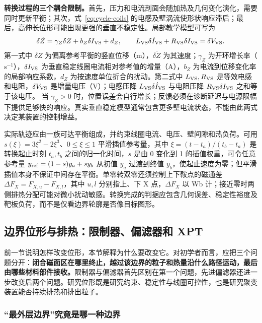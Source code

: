 \documentclass[12pt,fontset=none]{ctexart}
\numberwithin{equation}{section}
\numberwithin{table}{section}
\numberwithin{figure}{section}
\begin{document}
\textbf{转换过程的三个耦合限制。}首先，压力和电流剖面会随加热及几何变化演化，需要同时更新平衡；其次，式~\eqref{eq:cycle-coils} 的电感及壁涡流使形状响应滞后；最后，高伸长位形可能出现更强的垂直不稳定性。局部教学模型可写为
\begin{equation}\label{eq:cycle-vertical}
 \delta\dot Z=\gamma_Z\delta Z+b_Z\delta I_{\rm VS}+d_Z,
 \qquad L_{\rm VS}\delta\dot I_{\rm VS}+R_{\rm VS}\delta I_{\rm VS}=\delta V_{\rm VS}.
\end{equation}
第一式中 $\delta Z$ 为偏离参考平衡的竖直位移（m），$\delta\dot Z$ 为其速度；$\gamma_Z$ 为开环增长率（$\mathrm{s^{-1}}$），$\delta I_{\rm VS}$ 为垂直稳定线圈电流相对参考值的增量（A），$b_Z$ 为电流到位移变化率的局部响应系数，$d_Z$ 为按速度单位折合的扰动。第二式中 $L_{\rm VS},R_{\rm VS}$ 是等效电感和电阻，$\delta V_{\rm VS}$ 是增量电压（V）；电感压降 $L_{\rm VS}\delta\dot I_{\rm VS}$ 与电阻压降 $R_{\rm VS}\delta I_{\rm VS}$ 之和等于该电压。
当 $\gamma_Z>0$ 时，位置误差会自行增长；反馈必须在诊断延迟与电源限幅下提供足够快的响应。真实垂直稳定模型通常包含更多壁电流状态，不能由此两式决定某装置的控制增益。

实际轨迹应由一族可达平衡组成，并约束线圈电流、电压、壁间隙和热负荷。可用 $s(\xi)=3\xi^2-2\xi^3$、$0\leq\xi\leq1$ 平滑插值参考量，其中 $\xi=(t-t_a)/(t_b-t_a)$ 是转换起止时刻 $t_a,t_b$ 之间的归一化时间，$s$ 是由 0 变化到 1 的插值权重，可令任意参考量 $y_{\rm ref}=(1-s)y_a+sy_b$ 从初值 $y_a$ 过渡到终值 $y_b$，使起止速度为零；但平滑插值本身不保证中间存在平衡。单零转双零还须控制上下鞍点的磁通差 $\Delta F_X=F_{X,u}-F_{X,l}$，其中 $u,l$ 分别指上、下 X 点，$\Delta F_X$ 以 Wb 计；接近零时两侧排热分配可能对微小扰动敏感。转换完成的判据应包含几何误差、稳定性裕度及靶板负荷，而不是仅看边界轮廓是否像目标图形。

\subsection{边界位形与排热：限制器、偏滤器和 XPT}\label{sec:boundary-exhaust}

前一节说明怎样改变位形，本节解释为什么要改变它。对初学者而言，应把三个问题分开：\textbf{闭合磁面区在哪里终止，越过该边界的粒子和热量沿什么路径运动，最后由哪些材料部件接收。}限制器与偏滤器首先区别在第一个问题，先进偏滤器还进一步改变后两个问题。研究位形既是研究约束、稳定性与线圈可控性，也是研究聚变装置能否持续排热和排出粒子。

\subsubsection{``最外层边界''究竟是哪一种边界}
\end{document}
